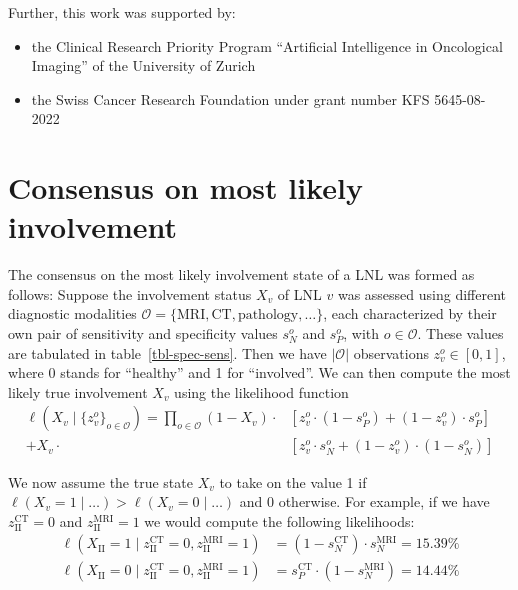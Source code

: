 \documentclass[
  sn-mathphys-num,
]{sn-jnl}
\providecommand{\tightlist}{%
  \setlength{\itemsep}{0pt}\setlength{\parskip}{0pt}}\usepackage{longtable,booktabs,array}
\begin{document}
Further, this work was supported by:

\begin{itemize}
\tightlist
\item
  the Clinical Research Priority Program ``Artificial Intelligence in
  Oncological Imaging'' of the University of Zurich
\item
  the Swiss Cancer Research Foundation under grant number KFS
  5645-08-2022
\end{itemize}

\section{Consensus on most likely involvement}\label{sec-consensus}

The consensus on the most likely involvement state of a LNL was formed
as follows: Suppose the involvement status \(X_v\) of LNL \(v\) was
assessed using different diagnostic modalities
\(\mathcal{O} = \{ \text{MRI}, \text{CT}, \text{pathology}, \ldots \}\),
each characterized by their own pair of sensitivity and specificity
values \(s_N^{o}\) and \(s_P^{o}\), with
\(o \in \mathcal{O}\). These values are tabulated in
table~\ref{tbl-spec-sens}. Then we have \(|\mathcal{O}|\) observations
\(z_v^{o} \in \left[ 0, 1 \right]\), where 0 stands for
``healthy'' and 1 for ``involved''. We can then compute the most likely
true involvement \(X_v\) using the likelihood function
%
\[
\begin{aligned}
\ell \left( X_v \mid \{ z_v^{o} \}_{o \in \mathcal{O}} \right) = \prod_{o \in \mathcal{O}}
\left( 1 - X_v \right) \cdot &\left[ z_v^{o} \cdot \left( 1 - s_P^{o} \right) + \left( 1 - z_v^{o} \right) \cdot s_P^{o} \right] \\
+ X_v \cdot &\left[ z_v^{o} \cdot s_N^{o} + \left( 1 - z_v^{o} \right) \cdot (1 - s_N^{o}) \right]
\end{aligned}
\]

We now assume the true state \(X_v\) to take on the value 1 if
\(\ell \left( X_v = 1 \mid \ldots \right) > \ell \left( X_v = 0 \mid \ldots \right)\)
and 0 otherwise. For example, if we have \(z_\text{II}^\text{CT} = 0\)
and \(z_\text{II}^\text{MRI} = 1\) we would compute the following
likelihoods:
%
\[
\begin{aligned}
\ell \left( X_\text{II} = 1 \mid z_\text{II}^\text{CT} = 0, z_\text{II}^\text{MRI} = 1 \right) &= \left( 1 - s_N^\text{CT} \right) \cdot s_N^\text{MRI} = 15.39\% \\
\ell \left( X_\text{II} = 0 \mid z_\text{II}^\text{CT} = 0, z_\text{II}^\text{MRI} = 1 \right) &= s_P^\text{CT} \cdot \left(1 - s_N^\text{MRI}\right) = 14.44\%
\end{aligned}
\]
\end{document}
